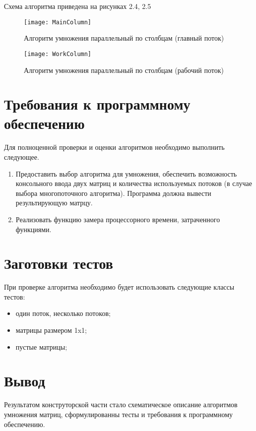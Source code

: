 Схема алгоритма приведена на рисунках 2.4, 2.5
\begin{figure}[h]
	\begin{center}
		{\texttt{[image: MainColumn]}}
		\caption{Алгоритм умножения параллельный по столбцам (главный поток)}
	\end{center}
\end{figure}
\begin{figure}[h]
	\begin{center}
		{\texttt{[image: WorkColumn]}}
		\caption{Алгоритм умножения параллельный по столбцам (рабочий поток)}
	\end{center}
\end{figure}

\section{Требования к программному обеспечению}
Для полноценной проверки и оценки алгоритмов необходимо выполнить следующее.
\begin{enumerate}
	\item Предоставить выбор алгоритма для умножения, обеспечить возможность консольного ввода двух матриц и количества используемых потоков (в случае выбора многопоточного алгоритма). Программа должна вывести результирующую матрцу.
	\item Реализовать функцию замера процессорного времени, затраченного функциями.
\end{enumerate}


\section{Заготовки тестов}
При проверке алгоритма необходимо будет использовать следующие классы тестов:
\begin{itemize}
	\item один поток, несколько потоков;
	\item матрицы размером 1x1;
	\item пустые матрицы;
\end{itemize}

\section*{Вывод}
Результатом конструторской части стало схематическое описание алгоритмов умножения матриц, сформулированны тесты и требования к программному обеспечению.



